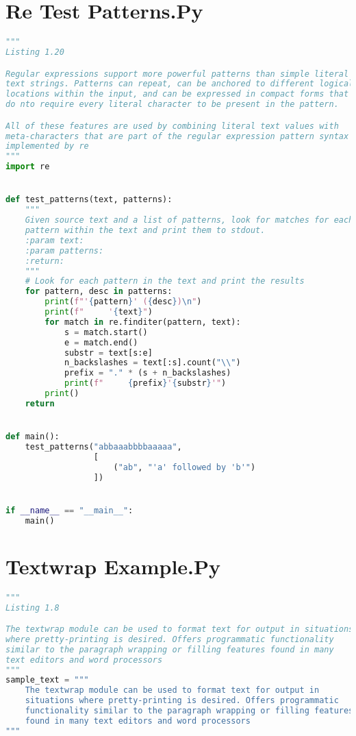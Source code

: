 \documentclass[a4paper,landscape]{report}
\begin{document}
\section{Re Test Patterns.Py}
\begin{lstlisting}[language=Python]
"""
Listing 1.20

Regular expressions support more powerful patterns than simple literal
text strings. Patterns can repeat, can be anchored to different logical
locations within the input, and can be expressed in compact forms that
do nto require every literal character to be present in the pattern.

All of these features are used by combining literal text values with
meta-characters that are part of the regular expression pattern syntax
implemented by re
"""
import re


def test_patterns(text, patterns):
    """
    Given source text and a list of patterns, look for matches for each
    pattern within the text and print them to stdout.
    :param text:
    :param patterns:
    :return:
    """
    # Look for each pattern in the text and print the results
    for pattern, desc in patterns:
        print(f"'{pattern}' ({desc})\n")
        print(f"     '{text}")
        for match in re.finditer(pattern, text):
            s = match.start()
            e = match.end()
            substr = text[s:e]
            n_backslashes = text[:s].count("\\")
            prefix = "." * (s + n_backslashes)
            print(f"     {prefix}'{substr}'")
        print()
    return


def main():
    test_patterns("abbaaabbbbaaaaa",
                  [
                      ("ab", "'a' followed by 'b'")
                  ])


if __name__ == "__main__":
    main()

\end{lstlisting}
\section{Textwrap Example.Py}
\begin{lstlisting}[language=Python]
"""
Listing 1.8

The textwrap module can be used to format text for output in situations
where pretty-printing is desired. Offers programmatic functionality
similar to the paragraph wrapping or filling features found in many
text editors and word processors
"""
sample_text = """
    The textwrap module can be used to format text for output in 
    situations where pretty-printing is desired. Offers programmatic 
    functionality similar to the paragraph wrapping or filling features 
    found in many text editors and word processors
"""
\end{lstlisting}
\end{document}
